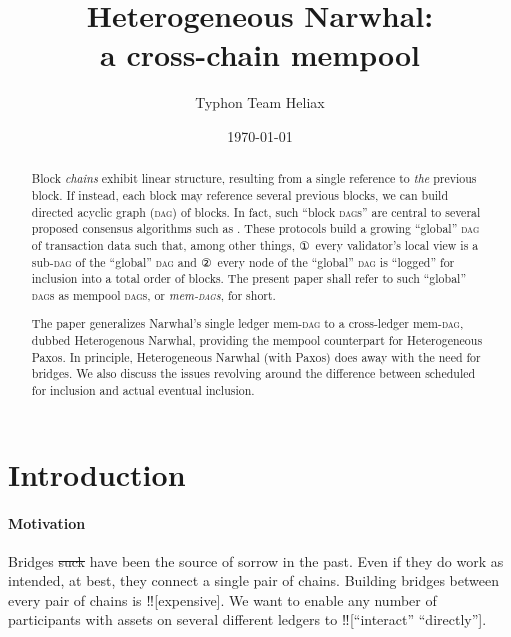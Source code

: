 \documentclass{article}
\title{%
  Heterogeneous Narwhal: %
  \\
  a cross-chain mempool \Dag%
}
\author{Typhon Team Heliax}
\date{\today}
\theoremstyle{definition}
\newcommand{\Dag}[1][]{\textsc{dag}#1\xspace}
\begin{document}
\maketitle
{}

\begin{abstract}
  \noindent
  Block \emph{chains} exhibit linear structure, 
  resulting from a single reference to \emph{the} previous block.
  If instead, 
  each block may reference several previous blocks,
  we can build directed acyclic graph (\Dag) of blocks.
  In fact,
  such “block \Dag[s]” are central to
  several proposed consensus algorithms such as
  . 
  These protocols build 
  a growing “global” \Dag of transaction data such that, 
  among other things,
  ① every validator's local view is a sub-\Dag of the “global” \Dag and %
  ② every node of the “global” \Dag is
  “logged” for inclusion into a total order of blocks.
  The present paper shall refer to such “global” \Dag[s]
  as {mempool \Dag[s]}, 
  or \emph{mem-\Dag[s]}, for short. 

  The paper generalizes 
  Narwhal's single ledger mem-\Dag to
  a cross-ledger mem-\Dag, 
  dubbed Heterogenous Narwhal,  
  providing the mempool counterpart for Heterogeneous Paxos. 
  In principle,
  Heterogeneous Narwhal (with Paxos) does away with the need for bridges. 
  We also discuss the issues revolving around
  the difference between scheduled for inclusion
  and actual eventual inclusion.
\end{abstract}

\tableofcontents

\section{Introduction}

\paragraph{Motivation%
%
}
Bridges%
\st{ suck} %
have been the source of sorrow in the past. 
Even if they do work as intended, 
at best, they connect a single pair of chains. 
Building bridges between every pair of chains
is ‼[expensive]. %
We want to enable
any number of participants with assets on several
different ledgers to ‼[“interact” “directly”].
\end{document}

